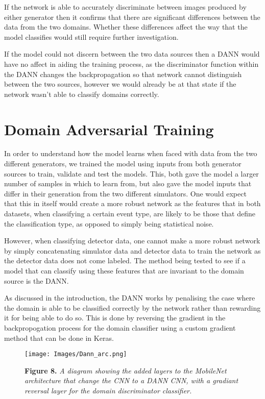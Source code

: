 \noindent If the network is able to accurately discriminate between images produced by either generator then it confirms that there are significant differences between the data from the two domains. Whether these differences affect the way that the model classifies would still require further investigation.\medskip

\noindent If the model could not discern between the two data sources then a DANN would have no affect in aiding the training process, as the discriminator function within the DANN changes the backpropagation so that network cannot distinguish between the two sources, however we would already be at that state if the network wasn't able to classify domains correctly.\medskip

\section{Domain Adversarial Training}

\noindent In order to understand how the model learns when faced with data from the two different generators, we trained the model using inputs from both generator sources to train, validate and test the models. This, both gave the model a larger number of samples in which to learn from, but also gave the model inputs that differ in their generation from the two different simulators. One would expect that this in itself would create a more robust network as the features that in both datasets, when classifying a certain event type, are likely to be those that define the classification type, as opposed to simply being statistical noise.\medskip

\noindent However, when classifying detector data, one cannot make a more robust network by simply concatenating simulator data and detector data to train the network as the detector data does not come labeled. The method being tested to see if a model that can classify using these features that are invariant to the domain source is the DANN.\medskip

As discussed in the introduction, the DANN works by penalising the case where the domain is able to be classified correctly by the network rather than rewarding it for being able to do so. This is done by reversing the gradient in the backpropogation process for the domain classifier using a custom gradient method that can be done in Keras.

\begin{figure}[t!]
 \centering
 \texttt{[image: Images/Dann\_arc.png]}
 
 \textbf{Figure 8.} \textit{A diagram showing the added layers to the MobileNet architecture that change the CNN to a DANN CNN, with a gradiant reversal layer for the domain discriminator classifier.}
\end{figure}

